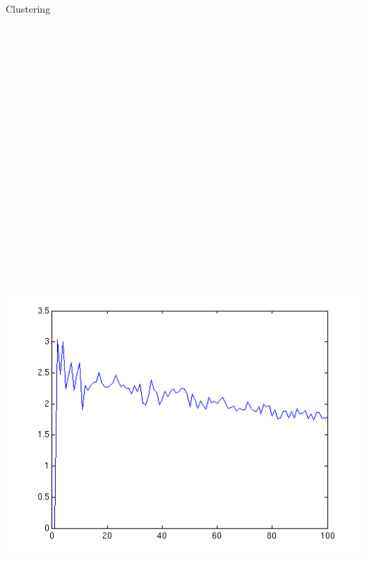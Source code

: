 \documentclass[final,t]{beamer}
\begin{document}
\begin{frame}{}
\begin{columns}[t]
\begin{column}{.3\linewidth}
\begin{block}{Clustering}
\begin{columns}[b]
  \includegraphics[width=60cm,height=36cm]{images/davies_k_vs_davies_index.png}
\end{columns} 




\end{block}
\end{column}
\end{columns}
\end{frame}
\end{document}
